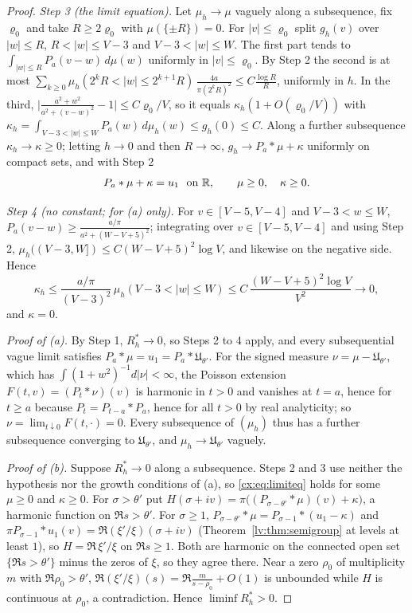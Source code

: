 \begin{proof}
\emph{Step 3 (the limit equation).} Let $\mu_h\to\mu$ vaguely along a subsequence, fix $\varrho_0$ and take $R\ge2\varrho_0$ with $\mu(\{\pm R\})=0$. For $|v|\le\varrho_0$ split $g_h(v)$ over $|w|\le R$, $R<|w|\le V-3$ and $V-3<|w|\le W$. The first part tends to $\int_{|w|\le R}P_a(v-w)\,d\mu(w)$ uniformly in $|v|\le\varrho_0$. By Step 2 the second is at most $\sum_{k\ge0}\mu_h(2^kR<|w|\le2^{k+1}R)\,\frac{4a}{\pi(2^kR)^2}\le C\frac{\log R}R$, uniformly in $h$. In the third, $\bigl|\frac{a^2+w^2}{a^2+(v-w)^2}-1\bigr|\le C\varrho_0/V$, so it equals $\kappa_h(1+O(\varrho_0/V))$ with $\kappa_h=\int_{V-3<|w|\le W}P_a(w)\,d\mu_h(w)\le g_h(0)\le C$. Along a further subsequence $\kappa_h\to\kappa\ge0$; letting $h\to0$ and then $R\to\infty$, $g_h\to P_a*\mu+\kappa$ uniformly on compact sets, and with Step 2
\begin{equation}\label{cx:eq:limiteq}
P_a*\mu+\kappa=u_1\ \text{ on }\mathbb{R},\qquad\mu\ge0,\quad\kappa\ge0 .
\end{equation}

\emph{Step 4 (no constant; for (a) only).} For $v\in[V-5,V-4]$ and $V-3<w\le W$, $P_a(v-w)\ge\frac{a/\pi}{a^2+(W-V+5)^2}$; integrating over $v\in[V-5,V-4]$ and using Step 2, $\mu_h((V-3,W])\le C(W-V+5)^2\log V$, and likewise on the negative side. Hence
\[
\kappa_h\le\frac{a/\pi}{(V-3)^2}\,\mu_h(V-3<|w|\le W)\le C\,\frac{(W-V+5)^2\log V}{V^2}\to0,
\]
and $\kappa=0$.

\emph{Proof of (a).} By Step 1, $R_h^*\to0$, so Steps 2 to 4 apply, and every subsequential vague limit satisfies $P_a*\mu=u_1=P_a*\mathfrak U_{\theta'}$. For the signed measure $\nu=\mu-\mathfrak U_{\theta'}$, which has $\int(1+w^2)^{-1}d|\nu|<\infty$, the Poisson extension $F(t,v)=(P_t*\nu)(v)$ is harmonic in $t>0$ and vanishes at $t=a$, hence for $t\ge a$ because $P_t=P_{t-a}*P_a$, hence for all $t>0$ by real analyticity; so $\nu=\lim_{t\downarrow0}F(t,\cdot)=0$. Every subsequence of $(\mu_h)$ thus has a further subsequence converging to $\mathfrak U_{\theta'}$, and $\mu_h\to\mathfrak U_{\theta'}$ vaguely.

\emph{Proof of (b).} Suppose $R_h^*\to0$ along a subsequence. Steps 2 and 3 use neither the hypothesis nor the growth conditions of (a), so \eqref{cx:eq:limiteq} holds for some $\mu\ge0$ and $\kappa\ge0$. For $\sigma>\theta'$ put $H(\sigma+iv)=\pi\bigl((P_{\sigma-\theta'}*\mu)(v)+\kappa\bigr)$, a harmonic function on $\Re s>\theta'$. For $\sigma\ge1$, $P_{\sigma-\theta'}*\mu=P_{\sigma-1}*(u_1-\kappa)$ and $\pi P_{\sigma-1}*u_1(v)=\Re(\xi'/\xi)(\sigma+iv)$ (Theorem~\ref{lv:thm:semigroup} at levels at least $1$), so $H=\Re\,\xi'/\xi$ on $\Re s\ge1$. Both are harmonic on the connected open set $\{\Re s>\theta'\}$ minus the zeros of $\xi$, so they agree there. Near a zero $\rho_0$ of multiplicity $m$ with $\Re\rho_0>\theta'$, $\Re(\xi'/\xi)(s)=\Re\frac m{s-\rho_0}+O(1)$ is unbounded while $H$ is continuous at $\rho_0$, a contradiction. Hence $\liminf R_h^*>0$.
\end{proof}

